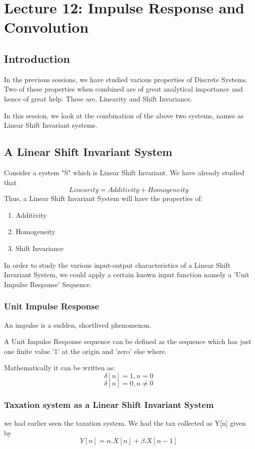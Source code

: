 \section{Lecture 12: Impulse Response and Convolution}



\subsection{Introduction}

In the previous sessions, we have studied various properties of Discrete Systems. Two of these properties when combined are of great analytical importance and hence of great help. These are, Linearity and Shift Invariance.

In this session, we look at the combination of the above two systems, names as Linear Shift Invariant systems. 

\subsection{A Linear Shift Invariant System}
Consider a system "S" which is Linear Shift Invariant. We have already studied that $$ Linearity = Additivity + Homogeneity$$
Thus, a Linear Shift Invariant System will have the properties of:
\begin{enumerate}
\item Additivity
\item Homogeneity
\item Shift Invariance
\end{enumerate}

In order to study the various input-output characteristics of a Linear Shift Invariant System, we could apply a certain known input function namely a 'Unit Impulse Response' Sequence. 


\subsubsection{Unit Impulse Response}
An impulse is a sudden, shortlived phenomenon.

A Unit Impulse Response sequence can be defined as the sequence which has just one finite value '1' at the origin and 'zero' else where.

Mathematically it can be written as:
$$ \delta[n] = 1, n=0$$
$$ \delta[n] = 0, n \neq 0 $$

\subsubsection{Taxation system as a Linear Shift Invariant System}
we had earlier seen the taxation system. We had the tax collected as Y[n] given by
$$Y[n] = { \alpha.X[n] +\beta. X[n-1] }$$
